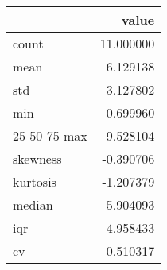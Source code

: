 \begin{tabular}{lr}
\toprule
 & value \\
\midrule
count & 11.000000 \\
mean & 6.129138 \\
std & 3.127802 \\
min & 0.699960 \\
25%
50%
75%
max & 9.528104 \\
skewness & -0.390706 \\
kurtosis & -1.207379 \\
median & 5.904093 \\
iqr & 4.958433 \\
cv & 0.510317 \\
\bottomrule
\end{tabular}
